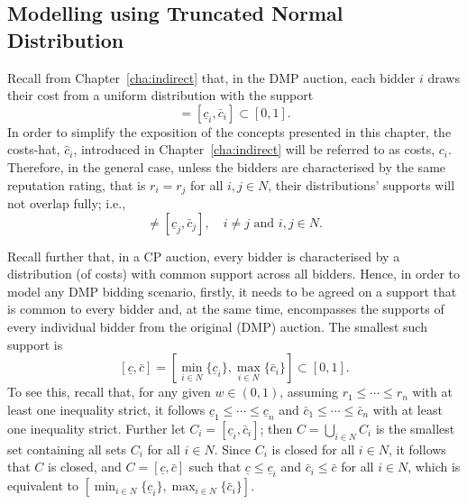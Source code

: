 \subsection{Modelling using Truncated Normal Distribution} %
\label{sub:modeling_using_truncated_normal_distribution_approximation}
Recall from Chapter~\ref{cha:indirect} that, in the DMP auction, each bidder $i$ draws their cost from a uniform distribution with the support
\begin{equation}
  [(1-w)r_i, (1-w)r_i + w] = [\underline{c}_i, \bar{c}_i] \subset [0,1].
\end{equation}
In order to simplify the exposition of the concepts presented in this chapter, the costs-hat, $\hat{c}_i$, introduced in Chapter~\ref{cha:indirect} will be referred to as costs, $c_i$. Therefore, in the general case, unless the bidders are characterised by the same reputation rating, that is $r_i=r_j$ for all $i,j\in N$, their distributions' supports will not overlap fully; i.e.,
\begin{equation}
  [\underline{c}_i,\bar{c}_i] \neq [\underline{c}_j,\bar{c}_j], \quad i\neq j \text{ and } i,j\in N.
\end{equation}

Recall further that, in a CP auction, every bidder is characterised by a distribution (of costs) with common support across all bidders. Hence, in order to model any DMP bidding scenario, firstly, it needs to be agreed on a support that is common to every bidder and, at the same time, encompasses the supports of every individual bidder from the original (DMP) auction. The smallest such support is
\begin{equation}
  \label{eq:domain_common_priors_approximation}
  [\underline{c},\bar{c}] = \displaystyle\left[\min_{i\in N}\{\underline{c}_i\}, \max_{i\in N}\{\bar{c}_i\}\right] \subset [0,1].
\end{equation}
To see this, recall that, for any given $w\in (0,1)$, assuming $r_1\leq\cdots\leq r_n$ with at least one inequality strict, it follows $\underline{c}_1\leq\cdots\leq\underline{c}_n$ and $\bar{c}_1\leq\cdots\leq\bar{c}_n$ with at least one inequality strict. Further let $C_i = [\underline{c}_i, \bar{c}_i]$; then $C = \bigcup_{i\in N} C_i$ is the smallest set containing all sets $C_i$ for all $i\in N$. Since $C_i$ is closed for all $i\in N$, it follows that $C$ is closed, and $C = [\underline{c}, \bar{c}]$ such that $\underline{c} \leq \underline{c}_i$ and $\bar{c}_i\leq \bar{c}$ for all $i\in N$, which is equivalent to $[\min_{i\in N}\{\underline{c}_i\}, \max_{i\in N}\{\bar{c}_i\}]$.

